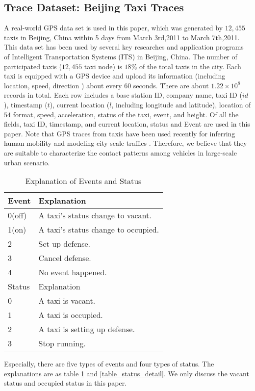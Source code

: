 \subsection{Trace Dataset: Beijing Taxi Traces}
\label{section_trace_data}

A real-world GPS data set is used in this paper, which was generated by $12,455$ taxis in Beijing, China within 5 days from March 3rd,2011 to March 7th,2011. This data set has been used by several key researches and application programs of Intelligent Transportation Systems (ITS) in Beijing, China. The number of participated taxis ($12,455$ taxi node) is $18\%$ of the total taxis in the city. Each taxi is equipped with a GPS device and upload its information (including location, speed, direction ) about every 60 seconds. There are about $1.22 \times 10^8$ records in total.
Each row includes a base station ID, company name, taxi ID ($id$), timestamp ($t$), current location ($l$, including longitude and latitude), location of $54$ format, speed, acceleration, status of the taxi, event, and height. Of all the fields, taxi ID, timestamp, and current location, status and Event are used in this paper.  Note that GPS traces from taxis have been used recently for inferring human mobility \cite{Ganti} and modeling city-scale traffics \cite{Aslam}. Therefore, we believe that they are suitable to characterize the contact patterns among vehicles in large-scale urban scenario.

\begin{table}[!t]
\caption{Explanation of Events and Status}\label{table_event_detail}
\centering
\begin{tabular}{l|l}
  \hline
  Event & Explanation \\
  \hline
  0(off) & A taxi's status change to vacant.\\
  \hline
  1(on) & A taxi's status change to occupied.\\
  \hline
  2 & Set up defense.\\
  \hline
  3 & Cancel defense.\\
  \hline
  4 & No event happened.\\
  \hline
  \hline
  Status & Explanation \\
  \hline
0 & A taxi is vacant. \\
    \hline
1 & A taxi is occupied. \\
    \hline
2 & A taxi is setting up defense. \\
    \hline
3 & Stop running.\\
  \hline
\end{tabular}
\end{table}


Especially, there are five types of events and four types of status. The explanations are as table \ref{table_event_detail} and \ref{table_status_detail}. We only discuss the vacant status and occupied status in this paper.






